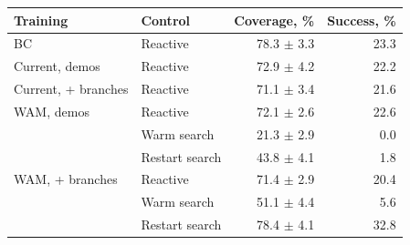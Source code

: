 \begin{tabular}{llrr}
\toprule
Training & Control & Coverage, \% & Success, \% \\
\midrule
BC & Reactive & 78.3 $\pm$ 3.3 & 23.3 \\
\addlinespace[2pt]
Current, demos & Reactive & 72.9 $\pm$ 4.2 & 22.2 \\
\addlinespace[2pt]
Current, + branches & Reactive & 71.1 $\pm$ 3.4 & 21.6 \\
\addlinespace[2pt]
WAM, demos & Reactive & 72.1 $\pm$ 2.6 & 22.6 \\
 & Warm search & 21.3 $\pm$ 2.9 & 0.0 \\
 & Restart search & 43.8 $\pm$ 4.1 & 1.8 \\
\addlinespace[2pt]
WAM, + branches & Reactive & 71.4 $\pm$ 2.9 & 20.4 \\
 & Warm search & 51.1 $\pm$ 4.4 & 5.6 \\
 & Restart search & 78.4 $\pm$ 4.1 & 32.8 \\
\bottomrule
\end{tabular}

